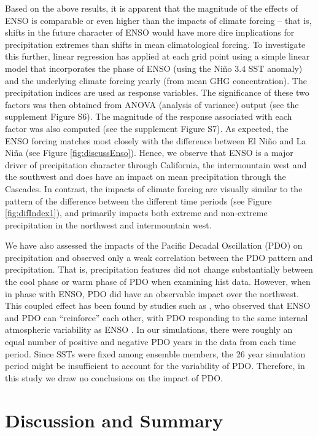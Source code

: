 Based on the above results, it is apparent that the magnitude of the effects of ENSO is comparable or even higher than the impacts of climate forcing -- that is, shifts in the future character of ENSO would have more dire implications for precipitation extremes than shifts in mean climatological forcing.  To investigate this further, linear regression has applied at each grid point using a simple linear model that incorporates the phase of ENSO (using the Ni\~no 3.4 SST anomaly) and the underlying climate forcing yearly (from mean GHG concentration).  The precipitation indices are used as response variables. The significance of these two factors was then obtained from ANOVA (analysis of variance) output (see the supplement Figure S6). The magnitude of the response associated with each factor was also computed (see the supplement Figure S7).  As expected, the ENSO forcing matches most closely with the difference between El Ni\~no and La Ni\~na (see Figure \ref{fig:discussEnso}).  Hence, we observe that ENSO is a major driver of precipitation character through California, the intermountain west and the southwest and does have an impact on mean precipitation through the Cascades. In contrast, the impacts of climate forcing are visually similar to the pattern of the difference between the different time periods (see Figure \ref{fig:difIndex1}), and primarily impacts both extreme and non-extreme precipitation in the northwest and intermountain west.


We have also assessed the impacts of the Pacific Decadal Oscillation (PDO) on precipitation and observed only a weak correlation between the PDO pattern and precipitation. That is, precipitation features did not change substantially between the cool phase or warm phase of PDO when examining \textsf{hist} data. However, when in phase with ENSO, PDO did have an observable impact over the northwest. This coupled effect has been found by studies such as \cite{gershunov1998interdecadal}, who observed that ENSO and PDO can ``reinforce'' each other, with PDO responding to the same internal atmospheric variability as ENSO \cite{pierce2002role}. In our simulations, there were roughly an equal number of positive and negative PDO years in the data from each time period. Since SSTs were fixed among ensemble members, the 26 year simulation period might be insufficient to account for the variability of PDO. Therefore, in this study we draw no conclusions on the impact of PDO.


\section{Discussion and Summary} \label{sec:Summary}

